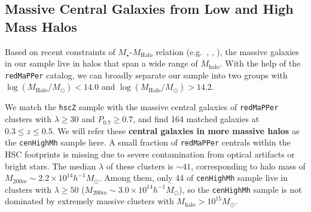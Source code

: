 \documentclass{emulateapj}
\def\arcsec{{\prime\prime}}
\def\redm{\texttt{redMaPPer}}
\def\rbcg{\texttt{cenHighMh}}
\def\mhalo{{$M_{\mathrm{halo}}$}}
\def\logmh{{$\log (M_{\mathrm{Halo}}/M_{\odot})$}}
\begin{document}
\begin{CJK*}{UTF8}{gbsn}
 
\subsection{Massive Central Galaxies from Low and High Mass Halos}
    \label{ssec:mass_central}
    
    Based on recent constraints of $M_{\star}$-$M_{\mathrm{Halo}}$ relation 
    (e.g.\ \citealt{Leauthaud2012}, \citealt{Behroozi2013}, \citealt{Kravtsov2014}),
    the massive galaxies in our sample live in halos that span a wide range of 
    \mhalo{}.
    With the help of the \redm{} catalog, we can broadly separate our sample into two
    groups with \logmh{}$<14.0$ and \logmh{}$>14.2$.
    
    
    We match the \texttt{hscZ} sample with the massive central galaxies of 
    \redm{} clusters with $\lambda \geq 30$ and $P_{\mathrm{0.7}} \geq 0.7$,
    and find 164 matched galaxies at $0.3 \leq z \leq 0.5$.
    We will refer these \textbf{central galaxies in more massive halos} as the 
    \rbcg{} sample here.
    A small fraction of \redm{} centrals within the HSC footprints is missing  
    due to severe contamination from optical artifacts or bright stars.
    The median $\lambda$ of these clusters is $\sim 41$, corresponding to 
    halo mass of $M_{200m}\sim 2.2\times 10^{14} h^{-1} M_{\odot}$.
    Among them, only 44 of \rbcg{} sample live in clusters with $\lambda \geq 50$
    ($M_{200m} \sim 3.0\times 10^{14} h^{-1} M_{\odot}$), so the \rbcg{} sample is 
    not dominated by extremely massive clusters with \mhalo{}$>10^{15} M_{\odot}$. 
    

\end{CJK*}
\end{document}
